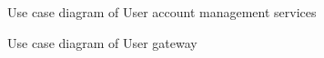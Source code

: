 \documentclass[12pt]{article}
\begin{document}
\begin{figure}[H]
\centering	
{}
\caption{Use case diagram of User account management services}
\end{figure}

\begin{figure}[H]
\centering	
{}
\caption{Use case diagram of User gateway}
\end{figure}
\end{document}
